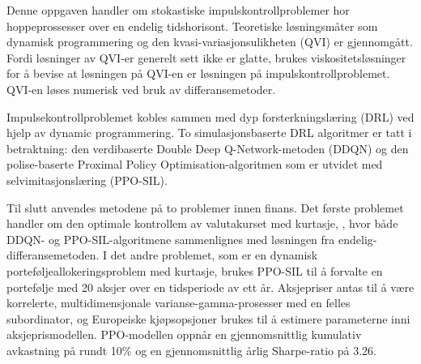 Denne oppgaven handler om stokastiske impulskontrollproblemer hor hoppeprossesser over en endelig tidshorisont. Teoretiske løsningsmåter som dynamisk programmering og den kvasi-variasjonsulikheten (QVI) er gjennomgått. Fordi løsninger av QVI-er generelt sett ikke er glatte, brukes viskositetsløsninger for å bevise at løsningen på QVI-en er løsningen på impulskontrollproblemet. QVI-en løses numerisk ved bruk av differansemetoder. 

Impulsekontrollproblemet kobles sammen med dyp forsterkningslæring (DRL) ved hjelp av dynamic programmering. To simulasjonsbaserte DRL algoritmer er tatt i betraktning: den verdibaserte Double Deep Q-Network-metoden (DDQN) og den polise-baserte Proximal Policy Optimisation-algoritmen som er utvidet med selvimitasjonslæring (PPO-SIL). 

Til slutt anvendes metodene på to problemer innen finans. Det første problemet handler om den optimale kontrollem av valutakurset med kurtasje, , hvor både DDQN- og PPO-SIL-algoritmene sammenlignes med løsningen fra endelig-differansemetoden. I det andre problemet, som er en dynamisk porteføljeallokeringsproblem med kurtasje, brukes PPO-SIL til å forvalte en portefølje med 20 aksjer over en tidsperiode av ett år. Aksjepriser antas til å være korrelerte, multidimensjonale varianse-gamma-prosesser med en felles subordinator, og Europeiske kjøpsopsjoner brukes til å estimere parameterne inni aksjeprismodellen. PPO-modellen oppnår en gjennomsnittlig kumulativ avkastning på rundt 10\% og en gjennomsnittlig årlig Sharpe-ratio på 3.26. 